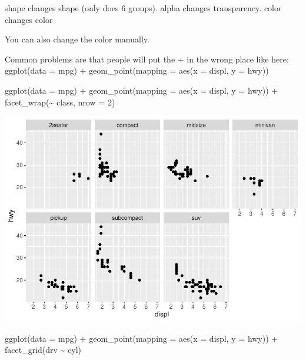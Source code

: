 \documentclass[
]{article}
\newenvironment{Shaded}{\begin{snugshade}}{\end{snugshade}}
\newcommand{\AttributeTok}[1]{\textcolor[rgb]{0.77,0.63,0.00}{#1}}
\newcommand{\DecValTok}[1]{\textcolor[rgb]{0.00,0.00,0.81}{#1}}
\newcommand{\FunctionTok}[1]{\textcolor[rgb]{0.00,0.00,0.00}{#1}}
\newcommand{\NormalTok}[1]{#1}
\newcommand{\SpecialCharTok}[1]{\textcolor[rgb]{0.00,0.00,0.00}{#1}}
\begin{document}
shape changes shape (only does 6 groups). alpha changes transparency.
color changes color

You can also change the color manually.

Common problems are that people will put the + in the wrong place like
here: ggplot(data = mpg) + geom\_point(mapping = aes(x = displ, y =
hwy))

\begin{Shaded}
\begin{Highlighting}[]
\FunctionTok{ggplot}\NormalTok{(}\AttributeTok{data =}\NormalTok{ mpg) }\SpecialCharTok{+} 
  \FunctionTok{geom\_point}\NormalTok{(}\AttributeTok{mapping =} \FunctionTok{aes}\NormalTok{(}\AttributeTok{x =}\NormalTok{ displ, }\AttributeTok{y =}\NormalTok{ hwy)) }\SpecialCharTok{+} 
  \FunctionTok{facet\_wrap}\NormalTok{(}\SpecialCharTok{\textasciitilde{}}\NormalTok{ class, }\AttributeTok{nrow =} \DecValTok{2}\NormalTok{)}
\end{Highlighting}
\end{Shaded}

\includegraphics{Journal_files/figure-latex/unnamed-chunk-46-1.pdf}

\begin{Shaded}
\begin{Highlighting}[]
\FunctionTok{ggplot}\NormalTok{(}\AttributeTok{data =}\NormalTok{ mpg) }\SpecialCharTok{+} 
  \FunctionTok{geom\_point}\NormalTok{(}\AttributeTok{mapping =} \FunctionTok{aes}\NormalTok{(}\AttributeTok{x =}\NormalTok{ displ, }\AttributeTok{y =}\NormalTok{ hwy)) }\SpecialCharTok{+} 
  \FunctionTok{facet\_grid}\NormalTok{(drv }\SpecialCharTok{\textasciitilde{}}\NormalTok{ cyl)}
\end{Highlighting}
\end{Shaded}
\end{document}
